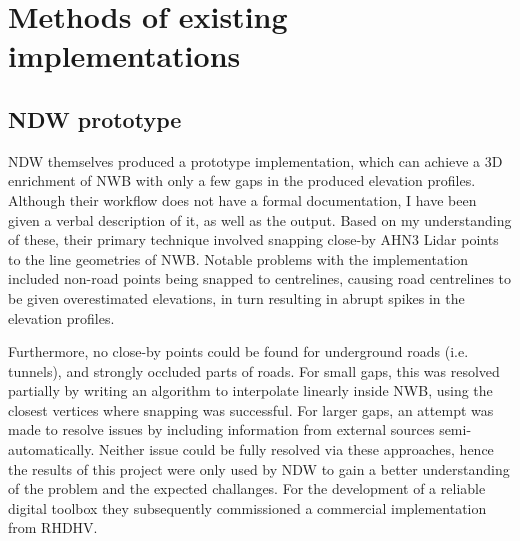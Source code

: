 \section{Methods of existing implementations}
\label{sec:methodsexisting}

\subsection{NDW prototype}
\label{sub:ndwprototype}

NDW themselves produced a prototype implementation, which can achieve a 3D enrichment of NWB with only a few gaps in the produced elevation profiles. Although their workflow does not have a formal documentation, I have been given a verbal description of it, as well as the output. Based on my understanding of these, their primary technique involved snapping close-by AHN3 Lidar points to the line geometries of NWB. Notable problems with the implementation included non-road points being snapped to centrelines, causing road centrelines to be given overestimated elevations, in turn resulting in abrupt spikes in the elevation profiles.

Furthermore, no close-by points could be found for underground roads (i.e. tunnels), and strongly occluded parts of roads. For small gaps, this was resolved partially by writing an algorithm to interpolate linearly inside NWB, using the closest vertices where snapping was successful. For larger gaps, an attempt was made to resolve issues by including information from external sources semi-automatically. Neither issue could be fully resolved via these approaches, hence the results of this project were only used by NDW to gain a better understanding of the problem and the expected challanges. For the development of a reliable digital toolbox they subsequently commissioned a commercial implementation from RHDHV.

